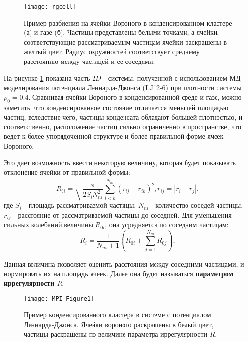 \begin{figure}[h]
\begin{center}
\texttt{[image: rgcell]}
\caption{Пример разбиения на ячейки Вороного в конденсированном кластере (а) и газе (б). Частицы представлены белыми точками, а ячейки, соответствующие рассматриваемым частицам ячейки раскрашены в желтый цвет. Радиус окружностей соответствует среднему расстоянию между частицей и ее соседями.}
\label{risFlucMed}
\end{center}
\end{figure}

На рисунке \ref{risFlucMed} показана часть $2D$ - системы, полученной с использованием МД-моделирования потенциала Леннарда-Джонса (LJ12-6) при плотности системы $\rho_0 = 0.4$.
Сравнивая ячейки Вороного в конденсированной среде и газе, можно заметить, что конденсированное состояние отличается меньшей площадью частиц, вследствие чего, частицы конденсата обладают большей плотностью, и соответственно, расположение частиц сильно ограниченно в пространстве, что ведет к более упорядоченной структуре и более правильной форме ячеек Вороного.

Это дает возможность ввести некоторую величину, которая будет показывать отклонение ячейки от правильной формы:
\begin{equation}
	R_{0i} = \sqrt{\frac{\pi}{2 S_i N_{ni}^2} \sum\limits_{i<k}^{N_{ni}} (r_{ij} - r_{ik})^2}, r_{ij} = |r_i - r_j|,
\end{equation}
где $S_i$ - площадь рассматриваемой частицы, $N_{ni}$ - количество соседей частицы, $r_{ij}$ - расстояние от рассматриваемой частицы до соседней.
Для уменьшения сильных колебаний величины $R_{0i}$, она усредняется по соседним частицам:
\begin{equation}\label{eqIrreg}
R_i = \frac{1}{N_{ni} + 1} \left( R_{0i} + \sum\limits_{j=1}^{N_{ni}} R_{0j} \right),
\end{equation}

Данная величина позволяет оценить расстояния между соседними частицами, и нормировать их на площадь ячеек.
Далее она будет называться \textbf{параметром иррегулярности $R$}.

\begin{figure}[h]
\begin{center}
\texttt{[image: MPI-Figure1]}
\caption{Пример конденсированного кластера в системе с потенциалом Леннарда-Джонса. Ячейки вороного раскрашены в белый цвет, частицы раскрашены по величине параметра иррегулярности $R$.}
\label{risIrreg}
\end{center}
\end{figure}

